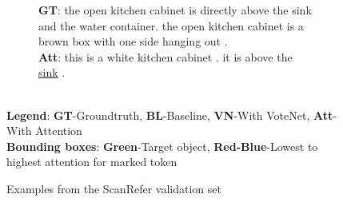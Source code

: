 \documentclass[10pt,twocolumn,letterpaper]{article}
\begin{document}
\begin{figure}
\begin{subfigure}[c]{.45\textwidth}
		\caption{
			\textbf{GT}: the open kitchen cabinet is directly above the sink and the water container. the open kitchen cabinet is a brown box with one side hanging out .\\
			\textbf{Att}: this is a white kitchen cabinet . it is above the \underline{sink} .\\}
		\label{fig:example_2}
	\end{subfigure}
	\vspace{.5\baselineskip}\\
	{\footnotesize
		\textbf{Legend}: \textbf{GT}-Groundtruth, \textbf{BL}-Baseline, \textbf{VN}-With VoteNet, \textbf{Att}-With Attention\\
		\textbf{Bounding boxes}: \textbf{\color{green} Green}-Target object, \textbf{{\color{red}Red}-{\color{blue}Blue}}-Lowest to highest attention for marked token
	}
	\caption{Examples from the ScanRefer validation set}
	\label{fig:examples}
	
\end{figure}


{\small


}
\end{document}
